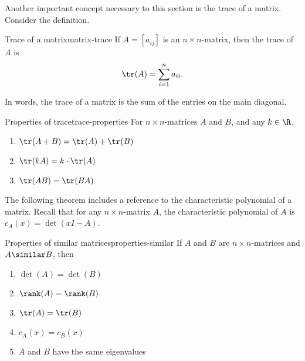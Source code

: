 Another important concept necessary to this section is the trace of a matrix. Consider the definition.

\begin{definition}{Trace of a matrix}{matrix-trace}
%
If $A=[a_{ij}]$ is an $n\times n$-matrix, then the
trace of $A$ is
\[ \tr(A) = \sum_{i=1}^n a_{ii}.\]
\end{definition}

In words, the trace of a matrix is the sum of the entries on the main diagonal.

\begin{lemma}{Properties of trace}{trace-properties}
For $n\times n$-matrices $A$ and $B$, and any $k\in\R$,
\begin{enumerate}
\item $\tr(A+B)=\tr(A) + \tr(B)$
\item $\tr(kA)=k\cdot\tr(A)$
\item $\tr(AB)=\tr(BA)$
\end{enumerate}
\end{lemma}

The following theorem includes a reference to the characteristic polynomial of a matrix. Recall that for any $n \times n$-matrix $A$, the characteristic polynomial of $A$ is $c_A(x)=\det(xI-A)$.

\begin{theorem}{Properties of similar matrices}{properties-similar}
If $A$ and $B$ are $n\times n$-matrices and $A\similar B$, then
\begin{enumerate}
\item $\det(A) = \det(B)$
\item $\rank(A) = \rank(B)$
\item $\tr(A)= \tr(B)$
\item $c_A(x)=c_B(x)$
\item $A$ and $B$ have the same eigenvalues
\end{enumerate}
\end{theorem}

